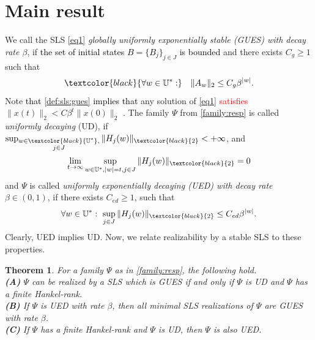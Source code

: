 \documentclass[journal,twoside,web]{ieeecolor}
\newtheorem{Theorem}{Theorem}[section]
\begin{document}
\section{Main result}
We call the SLS  \eqref{eq1} \emph{globally uniformly  exponentially stable (GUES)
with decay rate $\beta$}, if \textcolor{black}{the set of initial states $B=\{B_j\}_{j \in J}$ is bounded} and
  there exists $C_g \ge 1$ such that 
    \begin{equation}
    \label{def:sls:gues}
    \textcolor{black}{\forall w \in \mathbb{U}^{*}: }\quad 
    \|A_w\|_2 \le C_g\beta^{|w|}. 
    \end{equation}
Note \textcolor{black}{that} \eqref{def:sls:gues} \textcolor{black}{implies that} any solution of \eqref{eq1} \textcolor{red}{satisfies} $\|x(t)\|_2 < C\beta^t \|x(0)\|_2$ \cite{RJungers}. 
    The family $\Psi$ from \eqref{family:resp} 
     is called \emph{uniformly decaying} (UD), if 
     $\sup_{\substack{w \in \textcolor{black}{\mathbb{U}^{*}}, \\ j \in J}} \|H_j(w)\|_{\textcolor{black}{2}} < +\infty$, and 
     \begin{equation}
     \label{def:ud}
     \lim_{t \rightarrow \infty} \sup_{w \in \mathbb{U}^{*}, |w|=t,  j \in J} \|H_j(w)\|_{\textcolor{black}{2}}=0 
     \end{equation}
     and $\Psi$ is called  \emph{uniformly exponentially decaying (UED) with decay rate $\beta \in (0,1)$}, 
     if there exists $C_{ed} \ge 1$, %
     such that %
     \begin{equation}
     \label{def:ued}
     \forall w \in \mathbb{U}^*: ~ \sup_{j \in J} \|H_j(w)\|_{\textcolor{black}{2}} \le C_{ed}\beta^{|w|}.
     \end{equation}
     Clearly, UED implies UD.
     Now, we relate realizability by a stable SLS to these properties.
  \begin{Theorem}
  \label{main:theo}
  For a family $\Psi$ as in \eqref{family:resp}, the following hold.
  \\
    \textbf{(A)}
    $\Psi$ can be realized by a SLS which is GUES 
    if and only if $\Psi$ is UD  and $\Psi$ has a finite Hankel-rank.
    \\
    \textbf{(B)}
    If $\Psi$ is UED with rate $\beta$, then all minimal SLS realizations of $\Psi$ are GUES with rate $\beta$.  
    \\
  \textbf{(C)}
      If $\Psi$ has a finite Hankel-rank and $\Psi$ is UD, then $\Psi$ is also UED.     
  \end{Theorem}
\end{document}
